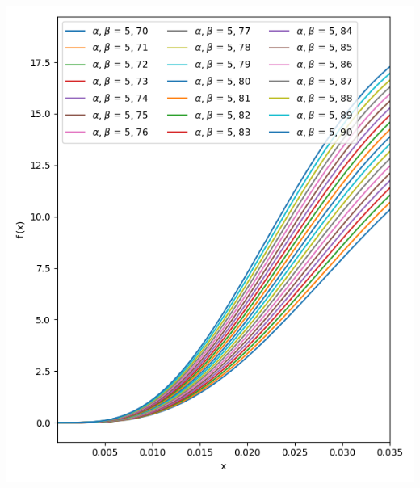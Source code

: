 \begin{minipage}[r]{0.48\columnwidth}
    \centering
    \includegraphics[width=\linewidth]{analysis_data/004__images_for_latex/beta2}
    \label{fig:beta2}
\end{minipage}


